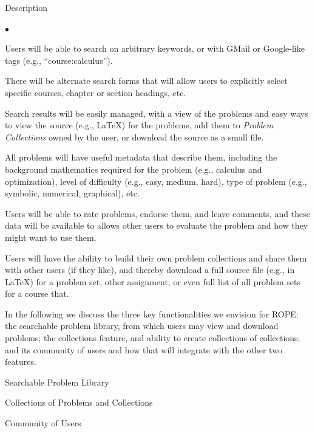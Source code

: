 \documentclass[11pt]{article}
\begin{document}
\begin{section}{Description}
\begin{list}{$\bullet$}{\setlength{\parsep}{0pt}\setlength{\itemsep}{0pt}}
  \item
    Users will be able to search on arbitrary keywords, or with GMail or
    Google-like tags (e.g., ``course:calculus'').
  \item
    There will be alternate search forms that will allow users to
    explicitly select specific courses, chapter or section headings, etc.
  \item
    Search results will be easily managed, with a view of the problems and
    easy ways to view the source (e.g., \LaTeX) for the problems, add them
    to \textit{Problem Collections\/} owned by the user, or download the
    source as a small file.
  \item
    All problems will have useful metadata that describe them, including
    the background mathematics required for the problem (e.g., calculus
    and optimization), level of difficulty (e.g., easy, medium, hard),
    type of problem (e.g., symbolic, numerical, graphical), etc.
  \item
    Users will be able to rate problems, endorse them, and leave comments,
    and these data will be available to allows other users to evaluate the
    problem and how they might want to use them.
  \item
    Users will have the ability to build their own problem collections and
    share them with other users (if they like), and thereby download a
    full source file (e.g., in \LaTeX) for a problem set, other
    assignment, or even full list of all problem sets for a course that.
\end{list}

In the following we discuss the three key functionalities we envision for
ROPE: the searchable problem library, from which users may view and
download problems; the collections feature, and ability to create
collections of collections; and its community of users and how that will
integrate with the other two features.

\begin{subsection}{Searchable Problem Library}

\end{subsection}

\begin{subsection}{Collections of Problems and Collections}

\end{subsection}

\begin{subsection}{Community of Users}


\end{subsection}
\end{section}
\end{document}
